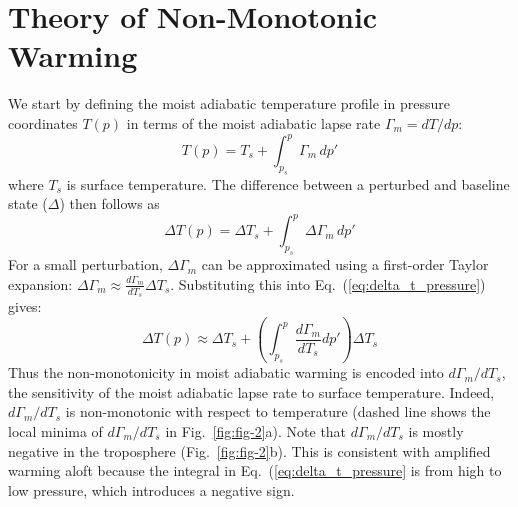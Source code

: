 \documentclass[draft]{ametsocV6.1}
\begin{document}
\section{Theory of Non-Monotonic Warming}
We start by defining the moist adiabatic temperature profile in pressure coordinates $T(p)$ in terms of the moist adiabatic lapse rate $\Gamma_m = dT/dp$:
\begin{equation}
T(p) = T_s + \int_{p_s}^{p} \Gamma_m \, dp' \label{eq:temp_profile_pressure}
\end{equation}
where $T_s$ is surface temperature. The difference between a perturbed and baseline state ($\Delta$) then follows as
\begin{equation}
\Delta T(p) = \Delta T_s + \int_{p_s}^{p} \Delta\Gamma_m \, dp' \label{eq:delta_t_pressure}
\end{equation}
For a small perturbation, $\Delta \Gamma_m$ can be approximated using a first-order Taylor expansion: $\Delta\Gamma_m \approx \frac{d\Gamma_m}{dT_s}\Delta T_s$. Substituting this into Eq.~(\ref{eq:delta_t_pressure}) gives:
\begin{equation}
\Delta T(p) \approx \Delta T_s + \left(\int_{p_s}^{p} \frac{d\Gamma_m}{dT_s}dp'\right)\Delta T_s \label{eq:delta_t_taylor_pressure}
\end{equation}
Thus the non-monotonicity in moist adiabatic warming is encoded into $d\Gamma_m/dT_s$, the sensitivity of the moist adiabatic lapse rate to surface temperature. Indeed, $d\Gamma_m/dT_s$ is non-monotonic with respect to temperature (dashed line shows the local minima of $d\Gamma_m/dT_s$ in Fig.~\ref{fig:fig-2}a). Note that $d\Gamma_m/dT_s$ is mostly negative in the troposphere (Fig.~\ref{fig:fig-2}b). This is consistent with amplified warming aloft because the integral in Eq.~(\ref{eq:delta_t_pressure} is from high to low pressure, which introduces a negative sign.
\end{document}
